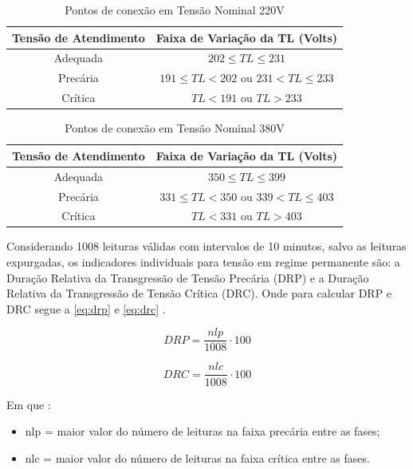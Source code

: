 \begin{table}[H]
  \centering
  \caption{Pontos de conexão em Tensão Nominal 220V}
  \label{tab:tensao_220}
  \begin{tabular}{@{}cc@{}}
  \toprule
  \textbf{Tensão de Atendimento} & \textbf{Faixa de Variação da TL (Volts)} \\ \midrule
  Adequada & $202 \leq TL \leq 231$ \\
  Precária & $191 \leq TL < 202$ ou $231 < TL \leq 233$ \\
  Crítica & $TL < 191$ ou $TL > 233$ \\ \bottomrule
  \end{tabular}
\end{table}

\begin{table}[H]
  \centering
  \caption{Pontos de conexão em Tensão Nominal 380V}
  \label{tab:tensao_380}
  \begin{tabular}{@{}cc@{}}
  \toprule
  \textbf{Tensão de Atendimento} & \textbf{Faixa de Variação da TL (Volts)} \\ \midrule
  Adequada & $350 \leq TL \leq 399$ \\
  Precária & $331 \leq TL < 350$ ou $339 < TL \leq 403$ \\
  Crítica & $TL < 331$ ou $TL > 403$ \\ \bottomrule
  \end{tabular}
\end{table}

Considerando 1008 leituras válidas com intervalos de 10 minutos, salvo as leituras expurgadas, os indicadores individuais para tensão em regime permanente são: a Duração Relativa da Transgressão de Tensão Precária (DRP) e a Duração Relativa da Transgressão de Tensão Crítica (DRC). Onde para calcular DRP e DRC segue a \autoref{eq:drp} e \autoref{eq:drc} \cite{ref:ANEEL2021}.

\begin{equation}
  DRP = \frac{nlp}{1008}\cdot100
  \label{eq:drp}
\end{equation}

\begin{equation}
  DRC = \frac{nlc}{1008}\cdot100
  \label{eq:drc}
\end{equation}

Em que \cite{ref:ANEEL2021}:

\begin{itemize}
  \item nlp = maior valor do número de leituras na faixa precária entre as fases;
  \item nlc = maior valor do número de leituras na faixa crítica entre as fases.
\end{itemize}

